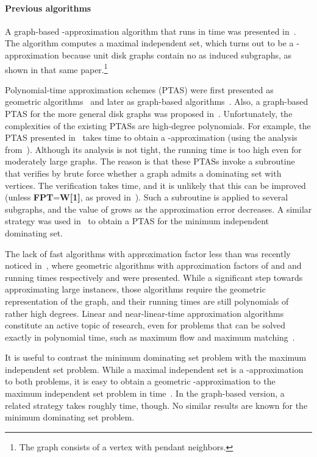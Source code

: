 \documentclass[preprint,12pt]{elsarticle}
\begin{document}
\paragraph*{Previous algorithms}
A graph-based -approximation algorithm that runs in  time was presented in~\cite{heuristics}. The algorithm computes a maximal independent set, which turns out to be a -approximation because unit disk graphs contain no  as induced subgraphs, as shown in that same paper.\footnote{The graph  consists of a vertex with  pendant neighbors.}

Polynomial-time approximation schemes (PTAS) were first presented as geometric algorithms~\cite{ptas-geometric} and later as graph-based algorithms~\cite{ptas-graph-journal}. Also, a graph-based PTAS for the more general disk graphs was proposed in~\cite{esa-Gibson}. Unfortunately, the complexities of the existing PTASs are high-degree polynomials. For example, the PTAS presented in~\cite{ptas-graph-journal} takes  time to obtain a -approximation (\mbox{using} the analysis from~\cite{cccg}). Although its analysis is not tight, the running time is too high even for moderately large graphs. The reason is that these PTASs invoke a subroutine that verifies by brute force whether a graph admits a dominating set with  vertices. The verification takes  time, and it is unlikely that this can be improved (unless \textbf{FPT}=\textbf{W[1]}, as proved in~\cite{marx}). Such a subroutine is applied to several subgraphs, and the value of  grows as the approximation error decreases. A similar strategy was used in~\cite{ids-ptas} to obtain a PTAS for the minimum independent dominating set.

The lack of fast algorithms with approximation factor less than  was recently noticed in~\cite{cccg}, where geometric algorithms with approximation factors of  and  and running times respectively  and  were presented. While a significant step towards approximating large instances, those algorithms require the geometric representation of the graph, and their running times are still polynomials of rather high degrees. Linear and near-linear-time approximation algorithms constitute an active topic of research, even for problems that can be solved exactly in polynomial time, such as maximum flow and maximum matching~\cite{maxflow,matchings}.

It is useful to contrast the minimum dominating set problem with the maximum independent set problem. While a maximal independent set is a -ap\-prox\-i\-ma\-tion to both problems, it is easy to obtain a geometric -ap\-prox\-i\-ma\-tion to the maximum independent set problem in  time~\cite{nieberg}. In the graph-based version, a related strategy takes roughly  time, though. No similar results are known for the minimum dominating set problem.
\end{document}
